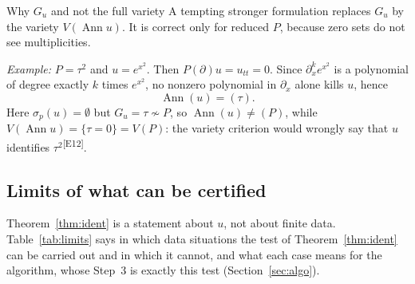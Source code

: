 \documentclass[11pt,a4paper]{article}
\theoremstyle{definition}
\newcommand{\edmark}[1]{\textsuperscript{\textcolor{cB}{\textsf{[#1]}}}}
\newcommand{\Ann}{\operatorname{Ann}}
\newcommand{\Var}{V}
\begin{document}
\begin{aside}{Why $G_u$ and not the full variety}
A tempting stronger formulation replaces $G_u$ by the variety $\Var(\Ann u)$. It is correct only for reduced $P$, because zero sets do not see multiplicities.

\emph{Example:} $P=\tau^2$ and $u=e^{x^2}$. Then $P(\partial)u=u_{tt}=0$. Since $\partial_x^ke^{x^2}$ is a polynomial of degree exactly $k$ times $e^{x^2}$, no nonzero polynomial in $\partial_x$ alone kills $u$, hence
\[
\Ann(u)=(\tau).
\]
Here $\sigma_p(u)=\emptyset$ but $G_u=\tau\not\sim P$, so $\Ann(u)\ne(P)$, while $\Var(\Ann u)=\{\tau=0\}=\Var(P)$: the variety criterion would wrongly say that $u$ identifies $\tau^2$\edmark{E12}.
\end{aside}

\subsection{Limits of what can be certified}\label{sec:ident-limits}
Theorem~\ref{thm:ident} is a statement about $u$, not about finite data. Table~\ref{tab:limits} says in which data situations the test of Theorem~\ref{thm:ident} can be carried out and in which it cannot, and what each case means for the algorithm, whose Step~3 is exactly this test (Section~\ref{sec:algo}).
\end{document}
